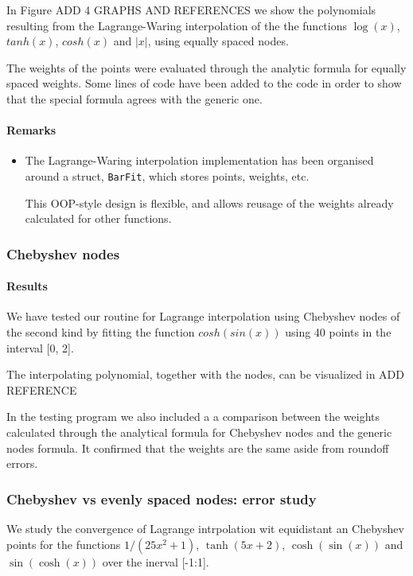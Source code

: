 \documentclass[a4paper,11]{article}
\newcommand{\mdcode}[1]{\lstinline[backgroundcolor=\color{gray!10}, frame=single, frameround=tttt]|#1|}
\begin{document}
In Figure ADD 4 GRAPHS AND REFERENCES we show the polynomials resulting from the
Lagrange-Waring interpolation of the
the functions $\log(x)$, $tanh(x)$, $cosh(x)$ and $|x|$, using 
equally spaced nodes.

The weights of the points were evaluated through the analytic formula for 
equally spaced weights. Some lines of code have been added to the code in order
to show that the special formula agrees with the generic one.

\paragraph{Remarks}

\begin{itemize}
	\item{
		The Lagrange-Waring interpolation implementation has been organised 
		around a struct, \mdcode{BarFit}, which stores points, weights, etc.
		
		This OOP-style design is flexible, and allows reusage of the weights 
		already calculated for other functions.
	}
\end{itemize}

\subsubsection{Chebyshev nodes}

\paragraph{Results}

We have tested our routine for Lagrange interpolation using Chebyshev nodes 
of the second kind by
fitting the function $cosh(sin(x))$ using 40 points in the interval [0, 2\pi].{}

The interpolating polynomial, together with the nodes, can be visualized in
ADD REFERENCE

In the testing program we also included a a comparison between the weights 
calculated through the analytical formula for Chebyshev nodes and the generic 
nodes formula. It confirmed that the weights are the same aside from roundoff
errors.

\subsubsection{Chebyshev vs evenly spaced nodes: error study}

We study the convergence of Lagrange intrpolation wit equidistant an Chebyshev 
points for the functions $1/(25x^{2}+1)$, $\tanh(5x+2)$, $\cosh(\sin(x))$ and
$\sin(\cosh(x))$ over the inerval [-1:1].
\end{document}
